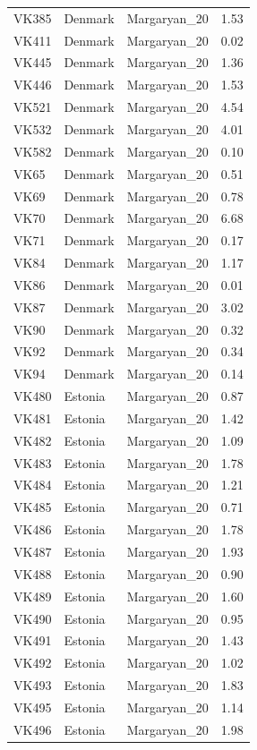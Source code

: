 \begin{longtable}[t]{lllr}
VK385 & Denmark & Margaryan\_20 & 1.53\\
VK411 & Denmark & Margaryan\_20 & 0.02\\
VK445 & Denmark & Margaryan\_20 & 1.36\\
VK446 & Denmark & Margaryan\_20 & 1.53\\
VK521 & Denmark & Margaryan\_20 & 4.54\\
VK532 & Denmark & Margaryan\_20 & 4.01\\
VK582 & Denmark & Margaryan\_20 & 0.10\\
VK65 & Denmark & Margaryan\_20 & 0.51\\
VK69 & Denmark & Margaryan\_20 & 0.78\\
VK70 & Denmark & Margaryan\_20 & 6.68\\
VK71 & Denmark & Margaryan\_20 & 0.17\\
VK84 & Denmark & Margaryan\_20 & 1.17\\
VK86 & Denmark & Margaryan\_20 & 0.01\\
VK87 & Denmark & Margaryan\_20 & 3.02\\
VK90 & Denmark & Margaryan\_20 & 0.32\\
VK92 & Denmark & Margaryan\_20 & 0.34\\
VK94 & Denmark & Margaryan\_20 & 0.14\\
VK480 & Estonia & Margaryan\_20 & 0.87\\
VK481 & Estonia & Margaryan\_20 & 1.42\\
VK482 & Estonia & Margaryan\_20 & 1.09\\
VK483 & Estonia & Margaryan\_20 & 1.78\\
VK484 & Estonia & Margaryan\_20 & 1.21\\
VK485 & Estonia & Margaryan\_20 & 0.71\\
VK486 & Estonia & Margaryan\_20 & 1.78\\
VK487 & Estonia & Margaryan\_20 & 1.93\\
VK488 & Estonia & Margaryan\_20 & 0.90\\
VK489 & Estonia & Margaryan\_20 & 1.60\\
VK490 & Estonia & Margaryan\_20 & 0.95\\
VK491 & Estonia & Margaryan\_20 & 1.43\\
VK492 & Estonia & Margaryan\_20 & 1.02\\
VK493 & Estonia & Margaryan\_20 & 1.83\\
VK495 & Estonia & Margaryan\_20 & 1.14\\
VK496 & Estonia & Margaryan\_20 & 1.98\\

\end{longtable}
